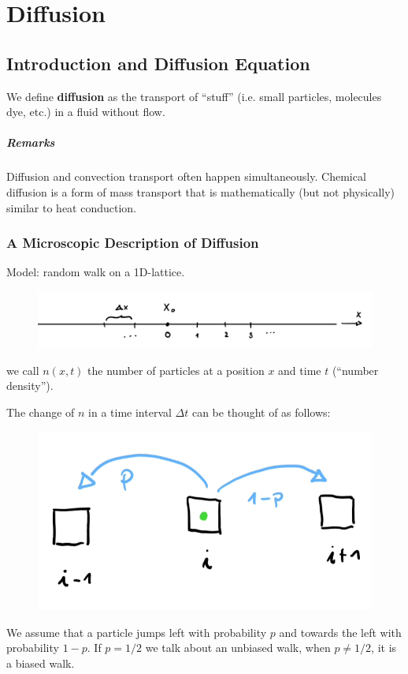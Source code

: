 \setcounter{chapter}{3}
\renewcommand{\thechapter}{D}
\chapter{Diffusion}


\section{Introduction and Diffusion Equation}
We define \textbf{diffusion} as the transport of \enquote{stuff} (i.e. small particles, molecules dye, etc.) in a fluid without flow.

\paragraph{Remarks} Diffusion and convection transport often happen simultaneously. Chemical diffusion is a form of mass transport that is mathematically (but not physically) similar to heat conduction.

\subsection{A Microscopic Description of Diffusion}
Model: random walk on a 1D-lattice.
\begin{figure}[H]
	\centering
	\includegraphics[width=0.7\linewidth]{Sketches/RandomWalk}
	\label{fig:randomwalk}
\end{figure}
we call $n(x,t)$ the number of particles at a position $x$ and time $t$ (\enquote{number density}).

The change of $n$ in a time interval $\Delta t$ can be thought of as follows:

\begin{figure}[H]
	\centering
	\includegraphics[width=0.3\linewidth]{Sketches/RandomWalkJumps}
	\caption{}
	\label{fig:randomwalkjumps}
\end{figure}

We assume that a particle jumps left with probability $p$ and towards the left with probability $1-p$. If $p=1/2$ we talk about an unbiased walk, when $p\ne 1/2$, it is a biased walk.

